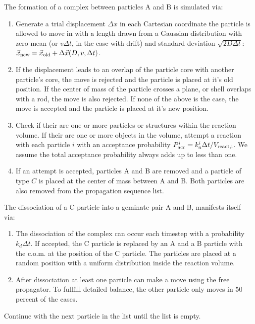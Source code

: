 The formation of a complex between particles A and B is simulated via:

\begin{enumerate}
\item Generate a trial displacement $\Delta x$ in each Cartesian coordinate the particle is allowed to move in with a length drawn from a Gaussian distribution with zero mean (or $v \Delta t$, in the case with drift) and standard deviation $\sqrt{2D\Delta t}$: $\vec{x}_{\rm new} = \vec{x}_{\rm old} + \Delta \vec{x}(D,v,\Delta t)$.
\item If the displacement leads to an overlap of the particle core with another particle's core, the move is rejected and the particle is placed at it's old position. If the center of mass of the particle crosses a plane, or shell overlaps with a rod, the move is also rejected. If none of the above is the case, the move is accepted and the particle is placed at it's new position.
\item Check if their are one or more particles or structures within the reaction volume. If their are one or more objects in the volume, attempt a reaction with each particle $i$ with an acceptance probability $P_{\rm acc}^i = k_{a}^i \Delta t/V_{\rm react, i}$. We assume the total acceptance probability always adds up to less than one. 
\item If an attempt is accepted, particles A and B are removed and a particle of type $C$ is placed at the center of mass between A and B. Both particles are also removed from the propagation sequence list. 
\end{enumerate}

The dissociation of a C particle into a geminate pair A and B, manifests itself via:

\begin{enumerate}
\item The dissociation of the complex can occur each timestep with a probability $k_d \Delta t$. If accepted, the C particle is replaced by an A and a B particle with the c.o.m. at the position of the C particle. The particles are placed at a random position with a uniform distribution inside the reaction volume.
\item After dissociation at least one particle can make a move using the free propagator. To fullfill detailed balance, the other particle only moves in 50 percent of the cases. 
\end{enumerate}
Continue with the next particle in the list until the list is empty.


